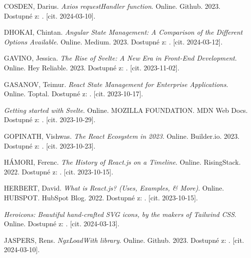 \begin{thebibliography}{99}
\textsc{COSDEN}, Darius. \emph{Axios requestHandler function}. Online. Github. 2023. Dostupné z: . [cit. 2024-03-10].

\textsc{DHOKAI}, Chintan. \emph{Angular State Management: A Comparison of the Different Options Available}. Online. Medium. 2023. Dostupné z: . [cit. 2024-03-12].

\textsc{GAVINO}, Jessica. \emph{The Rise of Svelte: A New Era in Front-End Development}. Online. Hey Reliable. 2023. Dostupné z: . [cit. 2023-11-02].

\textsc{GASANOV}, Teimur. \emph{React State Management for Enterprise Applications}. Online. Toptal. Dostupné z: . [cit. 2023-10-17].

\emph{Getting started with Svelte}. Online. MOZILLA FOUNDATION. MDN Web Docs. Dostupné z: . [cit. 2023-10-29].

\textsc{GOPINATH}, Vishwas. \emph{The React Ecosystem in 2023}. Online. Builder.io. 2023. Dostupné z: . [cit. 2023-10-23].

\textsc{HÁMORI}, Ferenc. \emph{The History of React.js on a Timeline}. Online. RisingStack. 2022. Dostupné z: . [cit. 2023-10-15].

\textsc{HERBERT}, David. \emph{What is React.js? (Uses, Examples, \& More)}. Online. HUBSPOT. HubSpot Blog. 2022. Dostupné z: . [cit. 2023-10-15].

\emph{Heroicons: Beautiful hand-crafted SVG icons, by the makers of Tailwind CSS}. Online. Dostupné z: . [cit. 2024-03-13].

\textsc{JASPERS}, Rens. \emph{NgxLoadWith library}. Online. Github. 2023. Dostupné z: . [cit. 2024-03-10].


\end{thebibliography}
